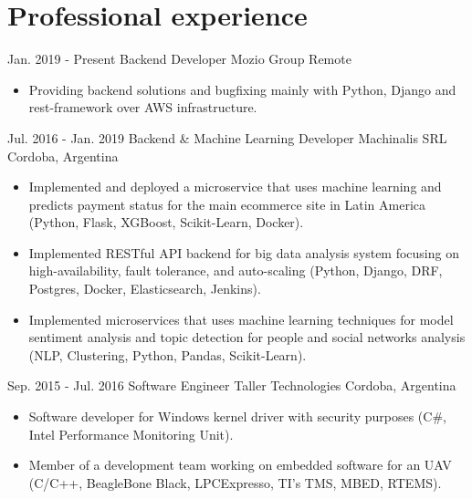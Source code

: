 
\section{Professional experience}

  \cventry
    {Jan. 2019 - Present} %
    {Backend Developer} %
    {Mozio Group} %
    {Remote} %
    {}
    {
      \begin{itemize} %
        \item {Providing backend solutions and bugfixing mainly with Python, Django and rest-framework over AWS infrastructure.}
      \end{itemize}
    }


  \cventry
    {Jul. 2016 - Jan. 2019} %
    {Backend \& Machine Learning Developer} %
    {Machinalis SRL} %
    {Cordoba, Argentina} %
    {}
    {
      \begin{itemize} %
        \item {Implemented and deployed a microservice that uses machine learning and predicts payment status for the main ecommerce site in Latin America (Python, Flask, XGBoost, Scikit-Learn, Docker).}
        \item {Implemented RESTful API backend for big data analysis system focusing on high-availability, fault tolerance, and auto-scaling (Python, Django, DRF, Postgres, Docker, Elasticsearch, Jenkins).}
        \item {Implemented microservices that uses machine learning techniques for model sentiment analysis and topic detection for people and social networks analysis (NLP, Clustering, Python, Pandas, Scikit-Learn).}
      \end{itemize}
    }

  \cventry
    {Sep. 2015 - Jul. 2016} %
    {Software Engineer} %
    {Taller Technologies} %
    {Cordoba, Argentina} %
    {}
    {
      \begin{itemize} %
        \item {Software developer for Windows kernel driver with security purposes (C\#, Intel Performance Monitoring Unit).}
        \item {Member of a development team working on embedded software for an UAV (C/C++, BeagleBone Black, LPCExpresso, TI's TMS, MBED, RTEMS).}
      \end{itemize}
    }

